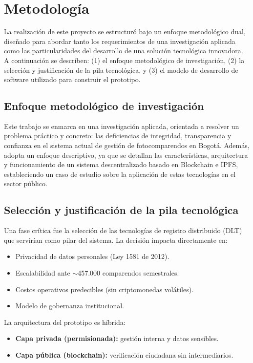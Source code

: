 \section{Metodología}

La realización de este proyecto se estructuró bajo un enfoque metodológico dual, diseñado para abordar tanto los requerimientos de una investigación aplicada como las particularidades del desarrollo de una solución tecnológica innovadora. A continuación se describen: (1) el enfoque metodológico de investigación, (2) la selección y justificación de la pila tecnológica, y (3) el modelo de desarrollo de software utilizado para construir el prototipo.

\subsection{Enfoque metodológico de investigación}

Este trabajo se enmarca en una investigación aplicada, orientada a resolver un problema práctico y concreto: las deficiencias de integridad, transparencia y confianza en el sistema actual de gestión de fotocomparendos en Bogotá. Además, adopta un enfoque descriptivo, ya que se detallan las características, arquitectura y funcionamiento de un sistema descentralizado basado en Blockchain e IPFS, estableciendo un caso de estudio sobre la aplicación de estas tecnologías en el sector público.

\subsection{Selección y justificación de la pila tecnológica}

Una fase crítica fue la selección de las tecnologías de registro distribuido (DLT) que servirían como pilar del sistema. La decisión impacta directamente en:

\begin{itemize}
    \item Privacidad de datos personales (Ley 1581 de 2012).
    \item Escalabilidad ante $\sim$457.000 comparendos semestrales.
    \item Costos operativos predecibles (sin criptomonedas volátiles).
    \item Modelo de gobernanza institucional.
\end{itemize}

La arquitectura del prototipo es híbrida:
\begin{itemize}
    \item \textbf{Capa privada (permisionada):} gestión interna y datos sensibles.
    \item \textbf{Capa pública (blockchain):} verificación ciudadana sin intermediarios.
\end{itemize}

